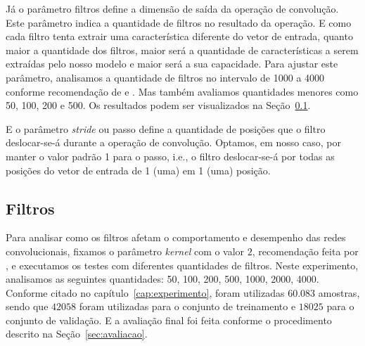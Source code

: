 Já o parâmetro filtros define a dimensão de saída da operação de convolução. Este parâmetro indica a quantidade de filtros no resultado da operação. E como cada filtro tenta extrair uma característica diferente do vetor de entrada, quanto maior a quantidade dos filtros, maior será a quantidade de características a serem extraídas pelo nosso modelo e maior será a sua capacidade. Para ajustar este parâmetro, analisamos a quantidade de filtros no intervalo de 1000 a 4000 conforme recomendação de  e . Mas também avaliamos quantidades menores como 50, 100, 200 e 500. Os resultados podem ser visualizados na Seção~\ref{sec:ape-filtros}.


E o parâmetro \textit{stride} ou passo define a quantidade de posições que o filtro deslocar-se-á durante a operação de convolução. Optamos, em nosso caso, por manter o valor padrão 1 para o passo, i.e., o filtro deslocar-se-á por todas as posições do vetor de entrada de 1 (uma) em 1 (uma) posição.




\subsection{Filtros}
\label{sec:ape-filtros}

Para analisar como os filtros afetam o comportamento e desempenho das redes convolucionais, fixamos o parâmetro \textit{kernel} com o valor $2$, recomendação feita por , e executamos os testes com diferentes quantidades de filtros. Neste experimento, analisamos as seguintes quantidades: 50, 100, 200, 500, 1000, 2000, 4000. Conforme citado no capítulo~\ref{cap:experimento}, foram utilizadas $60.083$ amostras, sendo que $42058$ foram utilizadas para o conjunto de treinamento e $18025$ para o conjunto de validação. E a avaliação final foi feita conforme o procedimento descrito na Seção~\ref{sec:avaliacao}.



